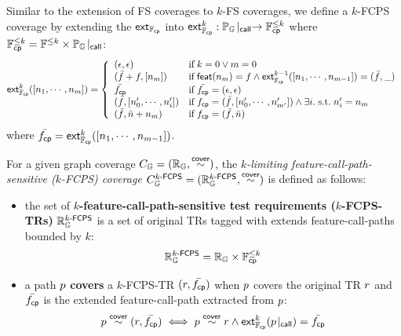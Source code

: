 Similar to the extension of FS coverages to $k$-FS coverages, we define a
$k$-FCPS coverage by extending the $\textsf{ext}_{\mathbb{F}_{\textsf{cp}}}$ into $\textsf{ext}_{\mathbb{F}_{\textsf{cp}}}^{k}:
{\mathbb{P}_{\mathbb{G}}}\!\mid_{\textsf{call}} \rightarrow \mathbb{F}_{\textsf{cp}}^{\leq k}$ where $\mathbb{F}_{\textsf{cp}}^{\leq k} =
\mathbb{F}^{\leq k} \times {\mathbb{P}_{\mathbb{G}}}\!\mid_{\textsf{call}}$:
%
\begin{equation}\label{equ:extfcps}
  \textsf{ext}_{\mathbb{F}_{\textsf{cp}}}^{k}([n_1, \cdots, n_m]) = \left\{
    \begin{array}{ll}
      (\epsilon, \epsilon) & \text{if} \; k = 0 \vee m = 0\\

      (\bar{f} + f, [n_m]) & \text{if} \; \textsf{feat}(n_m) = f \wedge
      \textsf{ext}_{\mathbb{F}_{\textsf{cp}}}^{k-1}([n_1, \cdots, n_{m-1}]) = (\bar{f}, \_)\\

      \bar{f_{\textsf{cp}}} & \text{if} \; \bar{f_{\textsf{cp}}} = (\epsilon, \epsilon)\\

      (\bar{f}, [n'_0, \cdots, n'_i]) &
      \text{if} \; f_{\textsf{cp}} = (\bar{f}, [n'_0, \cdots, n'_{m'}]) \wedge
      \exists i. {\; \text{s.t.} \; } n'_i = n_m\\

      (\bar{f}, \bar{n} + n_m) & \text{if} \; f_{\textsf{cp}} = (\bar{f}, \bar{n})\\
    \end{array}
  \right.
\end{equation}
%
where $\bar{f_{\textsf{cp}}} = \textsf{ext}_{\mathbb{F}_{\textsf{cp}}}^{k}([n_1, \cdots, n_{m-1}])$.


\begin{definition}\label{def:k-fcps-cov}
  For a given graph coverage $C_{\mathbb{G}} = (\mathbb{R}_{\mathbb{G}}, \overset{\textsf{cover}}{\sim})$, the
  \textit{$k$-limiting feature-call-path-sensitive ($k$-FCPS) coverage}
  $C_{\mathbb{G}}^{{k}\textsf{-FCPS}} = (\mathbb{R}_{\mathbb{G}}^{{k}\textsf{-FCPS}}, \overset{\textsf{cover}}{\sim})$ is defined as follows:
  \begin{itemize}
    \item the set of \textbf{$k$-feature-call-path-sensitive test requirements
      ($k$-FCPS-TRs)} $\mathbb{R}_{\mathbb{G}}^{{k}\textsf{-FCPS}}$ is a set of original TRs tagged
      with extends feature-call-paths bounded by $k$:
      \[
        \mathbb{R}_{\mathbb{G}}^{{k}\textsf{-FCPS}} = \mathbb{R}_{\mathbb{G}} \times \mathbb{F}_{\textsf{cp}}^{\leq k}
      \]
    \item a path $p$ \textbf{covers} a $k$-FCPS-TR $(r, \bar{f_{\textsf{cp}}})$ when $p$
      covers the original TR $r$ and $\bar{f_{\textsf{cp}}}$ is the extended feature-call-path
      extracted from $p$:
      \[
        p \overset{\textsf{cover}}{\sim} (r, \bar{f_{\textsf{cp}}}) \iff p \overset{\textsf{cover}}{\sim} r \wedge
        \textsf{ext}_{\mathbb{F}_{\textsf{cp}}}^{k}({p}\!\mid_{\textsf{call}}) = \bar{f_{\textsf{cp}}}
      \]
  \end{itemize}
\end{definition}

